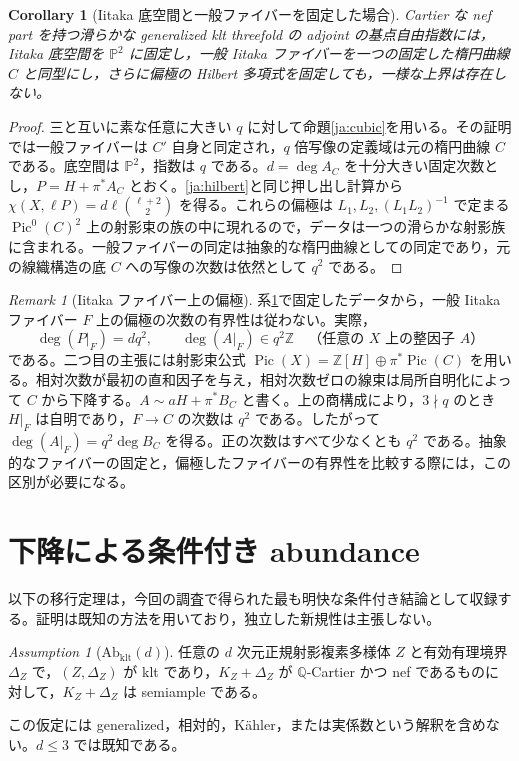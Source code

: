 \documentclass[12pt]{amsart}
\newtheorem{cor}[thm]{Corollary}
\theoremstyle{definition}
\theoremstyle{remark}
\newtheorem{rem}[thm]{Remark}
\newtheorem{assup}[thm]{Assumption}
\numberwithin{equation}{section}
\newcommand{\Z}{\mathbb{Z}}
\newcommand{\Q}{\mathbb{Q}}
\newcommand{\mP}{\mathbb{P}}
\DeclareMathOperator{\Pic}{Pic}
\begin{document}
\begin{cor}[Iitaka 底空間と一般ファイバーを固定した場合]\label{ja:fixeddata}
Cartier な nef part を持つ滑らかな generalized klt threefold の adjoint の基点自由指数には，Iitaka 底空間を $\mP^2$ に固定し，一般 Iitaka ファイバーを一つの固定した楕円曲線 $C$ と同型にし，さらに偏極の Hilbert 多項式を固定しても，一様な上界は存在しない。
\end{cor}
\begin{proof}
三と互いに素な任意に大きい $q$ に対して命題\ref{ja:cubic}を用いる。その証明では一般ファイバーは $C'$ 自身と同定され，$q$ 倍写像の定義域は元の楕円曲線 $C$ である。底空間は $\mP^2$，指数は $q$ である。$d=\deg A_C$ を十分大きい固定次数とし，$P=H+\pi^*A_C$ とおく。\eqref{ja:hilbert}と同じ押し出し計算から $\chi(X,\ell P)=d\ell\binom{\ell+2}{2}$ を得る。これらの偏極は $L_1,L_2,(L_1L_2)^{-1}$ で定まる $\Pic^0(C)^2$ 上の射影束の族の中に現れるので，データは一つの滑らかな射影族に含まれる。一般ファイバーの同定は抽象的な楕円曲線としての同定であり，元の線織構造の底 $C$ への写像の次数は依然として $q^2$ である。
\end{proof}

\begin{rem}[Iitaka ファイバー上の偏極]\label{ja:fibredegree}
系\ref{ja:fixeddata}で固定したデータから，一般 Iitaka ファイバー $F$ 上の偏極の次数の有界性は従わない。実際，
\[
 \deg(P|_F)=dq^2,\qquad
 \deg(A|_F)\in q^2\Z\quad\text{（任意の }X\text{ 上の整因子 }A\text{）}
\]
である。二つ目の主張には射影束公式
$\Pic(X)=\Z[H]\oplus\pi^*\Pic(C)$ を用いる。相対次数が最初の直和因子を与え，相対次数ゼロの線束は局所自明化によって $C$ から下降する。$A\sim aH+\pi^*B_C$ と書く。上の商構成により，$3\nmid q$ のとき $H|_F$ は自明であり，$F\to C$ の次数は $q^2$ である。したがって $\deg(A|_F)=q^2\deg B_C$ を得る。正の次数はすべて少なくとも $q^2$ である。抽象的なファイバーの固定と，偏極したファイバーの有界性を比較する際には，この区別が必要になる。
\end{rem}

\section{下降による条件付き abundance}\label{ja:descent}
以下の移行定理は，今回の調査で得られた最も明快な条件付き結論として収録する。証明は既知の方法を用いており，独立した新規性は主張しない。

\begin{assup}[$\mathrm{Ab}_{\mathrm{klt}}(d)$]\label{ja:Ab}
任意の $d$ 次元正規射影複素多様体 $Z$ と有効有理境界 $\Delta_Z$ で，$(Z,\Delta_Z)$ が klt であり，$K_Z+\Delta_Z$ が $\Q$-Cartier かつ nef であるものに対して，$K_Z+\Delta_Z$ は semiample である。
\end{assup}
この仮定には generalized，相対的，K\"ahler，または実係数という解釈を含めない。$d\leq3$ では既知である。
\end{document}
